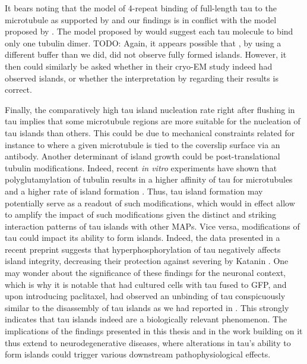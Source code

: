 It bears noting that the model of 4-repeat binding of full-length tau to the microtubule as supported by \cite{Kellogg2018} and our findings is in conflict with the model proposed by \cite{Mammeri}. The model proposed by \cite{Mammeri} would suggest each tau molecule to bind only one tubulin dimer. TODO: Again, it appears possible that \cite{Mammeri}, by using a different buffer than we did, did not observe fully formed islands. However, it then could similarly be asked whether \cite{Kellogg2018} in their cryo-EM study indeed had observed islands, or whether the interpretation by \cite{Mammeri} regarding their results is correct. \par


Finally, the comparatively high tau island nucleation rate right after flushing in tau  implies that some microtubule regions are more suitable for the nucleation of tau islands than others. This could be due to mechanical constraints related for instance to where a given microtubule is tied to the coverslip surface via an antibody. Another determinant of island growth could be post-translational tubulin modifications. Indeed, recent \textit{in vitro} experiments have shown that polyglutamylation of tubulin results in a higher affinity of tau for microtubules and a higher rate of island formation . Thus, tau island formation may potentially serve as a readout of such modifications, which would in effect allow to amplify the impact of such modifications given the distinct and striking interaction patterns of tau islands with other MAPs. Vice versa, modifications of tau could impact its ability to form islands. Indeed, the data presented in a recent preprint suggests that hyperphosphorylation of tau negatively affects island integrity, decreasing their protection against severing by Katanin . One may wonder about the significance of these findings for the neuronal context, which is why it is notable that \cite{siahaan2022microtubule} had cultured cells with tau fused to GFP, and upon introducing paclitaxel, had observed an unbinding of tau conspicuously similar to the disassembly of tau islands as we had reported in . This strongly indicates that tau islands indeed are a biologically relevant phenomenon. The implications of the findings presented in this thesis and in the work building on it thus extend to neurodegenerative diseases, where alterations in tau's ability to form islands could trigger various downstream pathophysiological effects.
